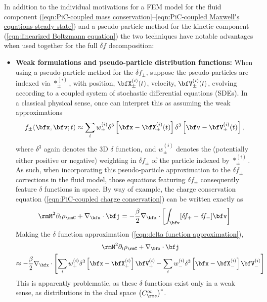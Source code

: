     In addition to the individual motivations for a FEM model for the fluid component (\ref{eqn:PiC-coupled mass conservation}--\ref{eqn:PiC-coupled Maxwell's equations steady-state}) and a pseudo-particle method for the kinetic component (\ref{eqn:linearized Boltzmann equation}) the two techniques have notable advantages when used together for the full $\delta\!f$ decomposition:
    \begin{itemize}
        \item  {\bf Weak formulations and pseudo-particle distribution functions:} When using a pseudo-particle method for the $\delta\!f_{\pm}$, suppose the pseudo-particles are indexed via $*_{\pm}^{(i)}$, with position, $\bfX_{\pm}^{(i)}(t)$, velocity, $\bfV_{\pm}^{(i)}(t)$, evolving according to a coupled system of stochastic differential equations (SDEs). In a classical physical sense, once can interpret this as assuming the weak approximations
        \begin{equation}\label{eqn:delta function approximation}
            f_{\pm}(\bfx, \bfv; t)  \approx  \sum_{i}w_{\pm}^{(i)}\delta^{3}\left[\bfx - \bfX_{\pm}^{(i)}(t)\right]\delta^{3}\left[\bfv - \bfV_{\pm}^{(i)}(t)\right],
        \end{equation}
        where $\delta^{3}$ again denotes the 3D $\delta$ function, and $w_{\pm}^{(i)}$ denotes the (potentially either positive or negative) weighting in $\delta\!f_{\pm}$ of the particle indexed by $*_{\pm}^{(i)}$. As such, when incorporating this pseudo-particle approximation to the $\delta\!f_{\pm}$ corrections in the fluid model, those equations featuring $\delta\!f_{\pm}$ consequently feature $\delta$ functions in space. By way of example, the charge conservation equation (\ref{eqn:PiC-coupled charge conservation}) can be written exactly as
        \begin{equation}
            \rmM^{2}\partial_{t}\rho_{\rmC} + \nabla_{\bfx}\cdot\bfj  =  - \frac{\beta}{2}\nabla_{\bfx}\cdot\left[\int_{\bfv}[\delta\!f_{+} - \delta\!f_{-}]\bfv\right]
        \end{equation}
        Making the $\delta$ function approximation (\ref{eqn:delta function approximation}),
        \begin{multline}\label{eqn:PiC-coupled charge conservation with pseudo-particles}
            \rmM^{2}\partial_{t}\rho_{\rmC} + \nabla_{\bfx}\cdot\bfj  \\
            \approx  - \frac{\beta}{2}\nabla_{\bfx}\cdot\left[\sum_{i}w_{+}^{(i)}\delta^{3}\left[\bfx - \bfX_{+}^{(i)}\right]\bfV_{+}^{(i)} - \sum_{i}w_{-}^{(i)}\delta^{3}\left[\bfx - \bfX_{-}^{(i)}\right]\bfV_{-}^{(i)}\right]
        \end{multline}        
        This is apparently problematic, as these $\delta$ functions exist only in a weak sense, as distributions in the dual space $\left(C^{\infty}_{\rmc}\right)^{*}$.
        

\end{itemize}
